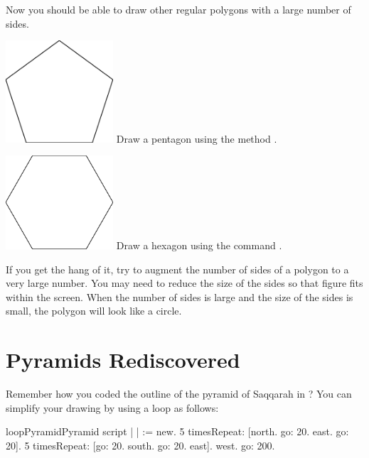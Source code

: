 Now you should be able to draw other regular polygons with a large
number of sides.


\begin{exofigwithsize}{\includegraphics[width=4cm]{loopPentagon}} \label{exo:pentagonRepeat}
Draw a pentagon using the method \timesRepeat.
\end{exofigwithsize}

\begin{exofigwithsize}{\includegraphics[width=4cm]{loopHexagon}}\label{exo:hexagonRepeat}
Draw a hexagon using the command \timesRepeat.
\end{exofigwithsize}


If you get the hang of it, try to augment the number of sides of a
polygon to a very large number. You may need to reduce the size of
the sides so that figure fits within the screen. When the
number of sides is large and the size of the sides is small, the
polygon will look like a circle.


\section{Pyramids Rediscovered}\label{sec:bouclonpyramids}
Remember how you coded the outline of the pyramid of Saqqarah in
? You can simplify your drawing by using a loop 
as follows:

\begin{scriptfig}{loopPyramid}{Pyramid script} \label{scr:pyramid}
| \caro |
\caro := \Turtle new.
5 timesRepeat: 
     [\caro north.
     \caro go: 20.
     \caro east.
     \caro go: 20].
5 timesRepeat: 
     [\caro go: 20.
     \caro south.
     \caro go: 20.
     \caro east].
\caro west.
\caro go: 200.
\end{scriptfig}

